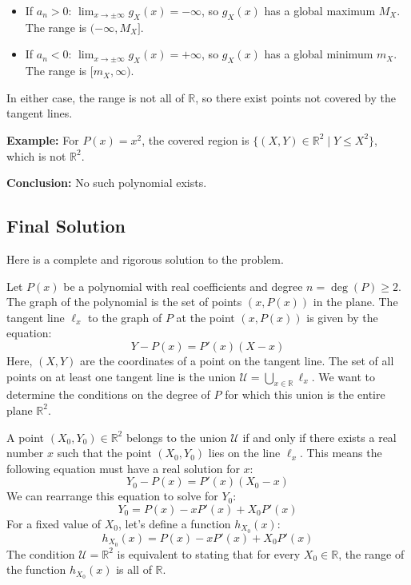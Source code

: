 \documentclass[12pt,a4paper]{article}
\theoremstyle{definition}
\begin{document}
\begin{itemize}
\item If $a_n > 0$: $\lim_{x\to\pm\infty} g_X(x) = -\infty$, so $g_X(x)$ has a global maximum $M_X$. The range is $(-\infty, M_X]$.
\item If $a_n < 0$: $\lim_{x\to\pm\infty} g_X(x) = +\infty$, so $g_X(x)$ has a global minimum $m_X$. The range is $[m_X, \infty)$.
\end{itemize}

In either case, the range is not all of $\mathbb{R}$, so there exist points not covered by the tangent lines.

\textbf{Example:} For $P(x) = x^2$, the covered region is $\{(X, Y) \in \mathbb{R}^2 \mid Y \leq X^2\}$, which is not $\mathbb{R}^2$.

\textbf{Conclusion:} No such polynomial exists.

\subsection{Final Solution}
Here is a complete and rigorous solution to the problem.

Let $P(x)$ be a polynomial with real coefficients and degree $n = \deg(P) \geq 2$. The graph of the polynomial is the set of points $(x, P(x))$ in the plane. The tangent line $\ell_x$ to the graph of $P$ at the point $(x, P(x))$ is given by the equation:
$$Y - P(x) = P'(x)(X - x)$$
Here, $(X, Y)$ are the coordinates of a point on the tangent line. The set of all points on at least one tangent line is the union $\mathcal{U} = \bigcup_{x \in \mathbb{R}} \ell_x$. We want to determine the conditions on the degree of $P$ for which this union is the entire plane $\mathbb{R}^2$.

A point $(X_0, Y_0) \in \mathbb{R}^2$ belongs to the union $\mathcal{U}$ if and only if there exists a real number $x$ such that the point $(X_0, Y_0)$ lies on the line $\ell_x$. This means the following equation must have a real solution for $x$:
$$Y_0 - P(x) = P'(x)(X_0 - x)$$
We can rearrange this equation to solve for $Y_0$:
$$Y_0 = P(x) - xP'(x) + X_0 P'(x)$$
For a fixed value of $X_0$, let's define a function $h_{X_0}(x)$:
$$h_{X_0}(x) = P(x) - xP'(x) + X_0 P'(x)$$
The condition $\mathcal{U} = \mathbb{R}^2$ is equivalent to stating that for every $X_0 \in \mathbb{R}$, the range of the function $h_{X_0}(x)$ is all of $\mathbb{R}$.
\end{document}

